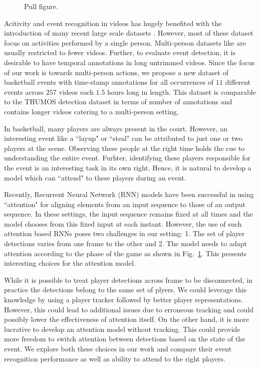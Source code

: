 \documentclass[10pt,twocolumn,letterpaper]{article}
\begin{document}
\begin{figure}[ht!]
\begin{center}
\fbox{\rule{0pt}{2in} \rule{.9\linewidth}{0pt}}
\end{center}
   \caption{Pull figure.}
\label{fig:pull_figure}
\end{figure}

Acitivity and event recognition in videos has hugely benefited with the
introduction of many recent large scale datasets \cite{}. However, most of
these dataset focus on activities performed by a single person.  Multi-person
datasets like \cite{} are usually restricted to fewer videos.  Further, to
evaluate event detection, it is desirable to have temporal annotations in long
untrimmed videos. Since the focus of our work is towards multi-person actions,
we propose a new dataset of basketball events with time-stamp annotations for
all occurrences of $11$ different events across $257$ videos each $1.5$ hours
long in length.  This dataset is comparable to the THUMOS \cite{THUMOS}
detection dataset in terms of number of annotations and contains longer videos
catering to a multi-person setting.

In basketball, many players are always present in the court.
However, an interesting event like a ``layup" or ``steal" can be attributed
to just one or two players at the scene. Observing these people at the right
time holds the cue to understanding the entire event. Furhter, identifying
these players responsible for the event is an interesting task in its own right.
Hence, it is natural to develop a model which can ``attend" to these players during
an event.

Recently, Recurrent Neural Network (RNN) models have been successful in
using ``attention" \cite{Bahdnau_arxiv14,Xu_arxiv15,Yao_arxiv15} for aligning
elements from an input sequence to those of an output sequence. In these settings,
the input sequence remains fixed at all times and the model chooses from this
fixed input at each instant. However, the use of such attention based RNNs
poses two challenges in our setting:
1. The set of player detections varies from one frame to the other and
2. The model needs to adapt attention according to the phase of the game as
shown in Fig.~\ref{fig:pull_figure}. This presents interesting choices
for the attention model.

While it is possible to treat player detections across frame to be
disconnected, in practice the detections belong to the same set of plyers. We
could leverage this knowledge by using a player tracker followed by better
player representations. However, this could lead to additional issues due to
erroneous tracking and could possibly lower the effectiveness of attention
itself. On the other hand, it is more lucrative to develop an attention model
without tracking.  This could provide more freedom to switch attention between
detections based on the state of the event. We explore both these choices in
our work and compare their event recognition performance as well as ability to
attend to the right players.
\end{document}
